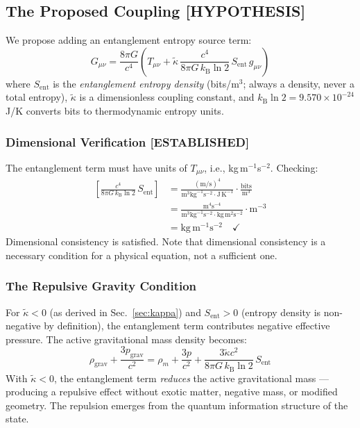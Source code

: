 \documentclass[12pt,letterpaper]{article}
\theoremstyle{plain}
\theoremstyle{definition}
\theoremstyle{remark}
\newcommand{\kB}{k_{\mathrm{B}}}
\newcommand{\Sent}{S_{\mathrm{ent}}}
\begin{document}
\subsection{The Proposed Coupling \textcolor{orange!80!black}{[HYPOTHESIS]}}

We propose adding an entanglement entropy source term:
\begin{equation}
  G_{\mu\nu} = \frac{8\pi G}{c^4}\!\left(T_{\mu\nu}
  + \tilde{\kappa}\,\frac{c^4}{8\pi G\,\kB\ln 2}\,\Sent\,g_{\mu\nu}\right)
  \tag{A1.2}
  \label{eq:modified_EFE}
\end{equation}
where $\Sent$ is the \emph{entanglement entropy density} (bits/m$^3$;
always a density, never a total entropy), $\tilde{\kappa}$ is a
dimensionless coupling constant, and $\kB\ln 2 = 9.570\times10^{-24}$
J/K converts bits to thermodynamic entropy units.

\subsubsection{Dimensional Verification \textcolor{blue!70!black}{[ESTABLISHED]}}

The entanglement term must have units of $T_{\mu\nu}$,
i.e., kg\,m$^{-1}$s$^{-2}$. Checking:
\begin{align}
  \left[\frac{c^4}{8\pi G\,\kB\ln 2}\,\Sent\right]
  &= \frac{(\text{m/s})^4}{\text{m}^3\text{kg}^{-1}\text{s}^{-2}
    \cdot\text{J}\,\text{K}^{-1}}
    \cdot\frac{\text{bits}}{\text{m}^3} \nonumber\\
  &= \frac{\text{m}^4\text{s}^{-4}}
    {\text{m}^3\text{kg}^{-1}\text{s}^{-2}\cdot\text{kg}\,\text{m}^2\text{s}^{-2}}
    \cdot\text{m}^{-3} \tag{A1.3}\\
  &= \text{kg}\,\text{m}^{-1}\text{s}^{-2}\quad\checkmark\nonumber
\end{align}
Dimensional consistency is satisfied. Note that dimensional consistency
is a necessary condition for a physical equation, not a sufficient one.

\subsubsection{The Repulsive Gravity Condition}

For $\tilde{\kappa} < 0$ (as derived in Sec.~\ref{sec:kappa}) and
$\Sent > 0$ (entropy density is non-negative by definition), the
entanglement term contributes negative effective pressure. The
active gravitational mass density becomes:
\begin{equation}
  \rho_{\mathrm{grav}} + \frac{3p_{\mathrm{grav}}}{c^2}
  = \rho_m + \frac{3p}{c^2}
  + \frac{3\tilde{\kappa}c^2}{8\pi G\,\kB\ln 2}\,\Sent
  \tag{A1.4}
\end{equation}
With $\tilde{\kappa} < 0$, the entanglement term \emph{reduces} the
active gravitational mass --- producing a repulsive effect without
exotic matter, negative mass, or modified geometry. The repulsion
emerges from the quantum information structure of the state.
\end{document}
